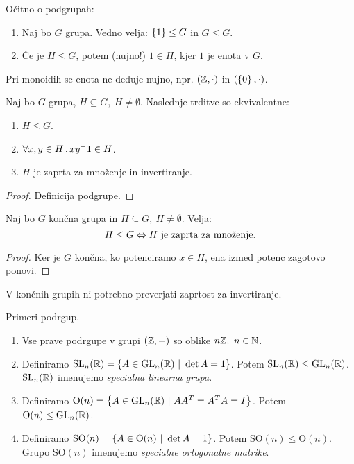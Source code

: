 \begin{opomba} 
    Očitno o podgrupah:
    \begin{enumerate}
        \item Naj bo $G$ grupa. Vedno velja: $\left\{1\right\} \leq G$ in $G \leq G$.
        \item Če je $H \leq G$, potem (nujno!) $1 \in H$, kjer $1$ je enota v $G$.
    \end{enumerate}
\end{opomba}

\begin{opomba}
    Pri monoidih se enota ne deduje nujno, npr. $(\mathbb{Z}, \cdot)$ in $(\left\{0\right\}, \cdot)$.
\end{opomba}

\begin{trditev}
    Naj bo $G$ grupa, $H \subseteq G, \ H \neq \emptyset$. Naslednje trditve so ekvivalentne:
    \begin{enumerate}
        \item $H \leq G$.
        \item $\forall x,y \in H \,.\, xy^-1 \in H$.
        \item $H$ je zaprta za množenje in invertiranje.
    \end{enumerate}
\end{trditev}

\begin{proof}
    Definicija podgrupe.
\end{proof}

\begin{posledica}
    Naj bo $G$ končna grupa in $H \subseteq G, \ H \neq \emptyset$. Velja: 
    $$H \leq G \Leftrightarrow H \text{ je zaprta za množenje}.$$
\end{posledica}

\begin{proof}
    Ker je $G$ končna, ko potenciramo $x \in H$, ena izmed potenc zagotovo ponovi.
\end{proof}

\begin{opomba}
    V končnih grupih ni potrebno preverjati zaprtost za invertiranje.
\end{opomba}

\begin{primer}
    Primeri podrgup.
    \begin{enumerate}
        \item Vse prave podrgupe v grupi $(\mathbb{Z}, +)$ so oblike $n\mathbb{Z}, \ n \in \mathbb{N}$.
        \item Definiramo $\operatorname{SL}_n(\mathbb{R}) = \left\{A \in \operatorname{GL}_n(\mathbb{R}) \ | \ \det A = 1\right\}$. Potem $\operatorname{SL}_n(\mathbb{R}) \leq \operatorname{GL}_n(\mathbb{R})$. $\operatorname{SL}_n(\mathbb{R})$ imenujemo \emph{specialna linearna grupa}.
        \item Definiramo $\text{O}(n) = \left\{A \in \operatorname{GL}_n(\mathbb{R}) \ | \ AA^T = A^TA = I\right\}$. Potem $\text{O}(n) \leq \operatorname{GL}_n(\mathbb{R})$.
        \item Definiramo $\text{SO}(n) = \left\{A \in \text{O}(n) \ | \ \det A = 1\right\}$. Potem $\text{SO}(n) \leq \text{O}(n)$. Grupo $\text{SO}(n)$ imenujemo \emph{specialne ortogonalne matrike}.
    \end{enumerate}
\end{primer}

